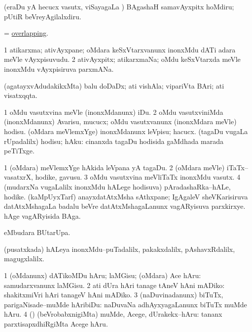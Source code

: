 \noindent
\gl{\akirx}
\bmng
(eraDu yA hecucx vasutx, viSayagaLa \vi) BAgashaH samavAyxpitx hoMdiru; pUtiR beVreyAgilalxdiru. 
\emng
\eentry

\bentry
{}
\gl{\nA}
\bmng
= \hyperlink{overlapping}{overlapping}. 
\emng
\eentry

\bentry
{}
\gl{\nA}
\bmng
\bnum
\num{1} atikarxma; ativAyxpane; oMdara keSxVtarxvanunx inonxMdu dATi adara meVle vAyxpisuvudu. 
\num{2} ativAyxpitx; atikarxmaNa; oMdu keSxVtarxda meVle inonxMdu vAyxpisiruva parxmANa. 
\enum
\emng
\eentry

\bentry
{}
\gl{\gu}
\bmng
(agatayxvAdudakikxMta) balu doDaDx; ati vishAla; vipariVta BAri; ati visatxqqta. 
\emng
\eentry

\bentry
{}
\gl{\sakirx}
\bmng
\bnum
\num{1} oMdu vasutxvina meVle (inonxMdanunx) iDu. 
\num{2} oMdu vasutxviniMda (inonxMdanunx) Avarisu, mucucx; oMdu vasutxvanunx (inonxMdara meVle) hodisu. 
 (oMdara meVlemxYge) inonxMdanunx 
\banum
{} leVpisu; hacucx. 
 (tagaDu \mo vugaLa rUpadalilx) hodisu; hAku:  cinanxda tagaDu hodisida gaMdhada marada peTiTxge. 
\eanum
\numie
\enum
\emng
\eentry

\bentry
{}
\gl{\nA}
\bmng
\bnum
\num{1} (oMdara) meVlemxYge hAkida leVpana yA tagaDu. 
\num{2} (oMdara meVle) iTaTx--vasatxrX, hodike, gavusu. 
\num{3} oMdu vasutxvina meVliTaTx inonxMdu vasutx. 
\num{4} (mudarxNa \mo vugaLalilx inonxMdu hALege hodisuva) pAradashaRka--hALe, hodike. 
 (kaMpUyxTarf) 
\banum
{} anayxdatAtxMsha sAthxpane; IgAgaleV sheVKarisiruva datAtxMshagaLa badalu beVre datAtxMshagaLanunx vagARyisuva parxkirxye. 
 hAge vagARyisida BAga. 
\eanum
\numie
\enum
\emng
\eentry

\bentry
{}
\gl{\kirx}
\bmng
{} eMbudara BUtarUpa. 
\emng
\eentry


\bentry
{}
\gl{\kirxvi}
\bmng
(pusatxkada) hALeya inonxMdu--puTadalilx, pakakxdalilx, pAshavxRdalilx, magugxlalilx. 
\emng
\eentry


\bentry
{}
\gl{\sakirx}
\bmng
\bnum
\num{1} (oMdanunx) dATikoMDu hAru; laMGisu; (oMdara) Ace hAru:  samudarxvanunx laMGisu. 
\num{2} ati dUra hAri tanage tAneV hAni mADiko:  shakitxmiVri hAri tanageV hAni mADiko. 
\num{3} (naDuvinadanunx) biTuTx, parigaNisade--muMde hAribiDu:  naDuvaNa adhAyxyagaLanunx biTuTx muMde hAru. 
\num{4} (\pArxparx) (beVrobabxnigiMta) muMde, Acege, dUrakekx--hAru:  tananx parxtisapxdhiRgiMta Acege hAru. 
\enum
\emng
\eentry


